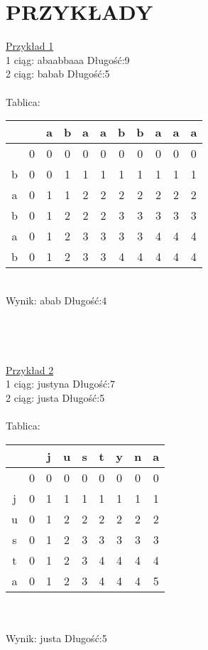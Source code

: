 \documentclass[11pt]{article}
\begin{document}
\section{PRZYKŁADY} 
 \underline{Przykład 1}
 \\ 1 ciąg: abaabbaaa      Długość:9\\
 	2 ciąg: babab			Długość:5 \\ \\
 	Tablica: \\
 	\begin{tabular}{|c|c|c|c|c|c|c|c|c|c|c|}
  \hline
   & &a&b&a&a&b&b&a&a&a \\
  \hline 
   &0&0&0&0&0&0&0&0&0&0 \\ \hline
   b&0&0&1&1&1&1&1&1&1&1\\ \hline
   a&0&1&1&2&2&2&2&2&2&2 \\ \hline
  b&0&1&2&2&2&3&3&3&3&3 \\ \hline
  a&0&1&2&3&3&3&3&4&4&4\\ \hline
  b&0&1&2&3&3&4&4&4&4&4 \\ \hline

  \end{tabular}
  \\ Wynik: abab			Długość:4
  \\ \\ \\ \\ \\
\underline{Przykład 2}
 \\ 1 ciąg: justyna      Długość:7\\
 	2 ciąg: justa			Długość:5 \\ \\
 	Tablica: \\
	\begin{tabular}{|c|c|c|c|c|c|c|c|c|}
  \hline
   & &j&u&s&t&y&n&a \\
  \hline
   &0&0&0&0&0&0&0&0 \\ \hline
   j&0&1&1&1&1&1&1&1\\ \hline
   u&0&1&2&2&2&2&2&2 \\ \hline
  s&0&1&2&3&3&3&3&3 \\ \hline
  t&0&1&2&3&4&4&4&4\\ \hline
  a&0&1&2&3&4&4&4&5 \\ \hline
  
  \end{tabular}
  \\\\ Wynik: justa			Długość:5
  \\ \\ \\ \\ \\ \\ \\ \\
\end{document}
